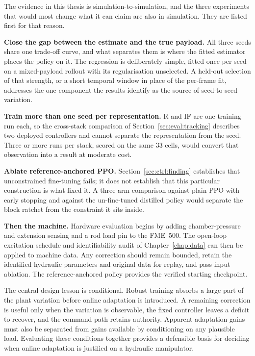 The evidence in this thesis is simulation-to-simulation, and the three
experiments that would most change what it can claim are also in simulation.
They are listed first for that reason.

\textbf{Close the gap between the estimate and the true payload.} All three
seeds share one trade-off curve, and what separates them is where the fitted
estimator places the policy on it. The regression is deliberately simple, fitted
once per seed on a mixed-payload rollout with its regularisation unselected. A
held-out selection of that strength, or a short temporal window in place of the
per-frame fit, addresses the one component the results identify as the source of
seed-to-seed variation.

\textbf{Train more than one seed per representation.} R and IF are one training
run each, so the cross-stack comparison of Section~\ref{sec:eval:tracking}
describes two deployed controllers and cannot separate the representation from
the seed. Three or more runs per stack, scored on the same $33$ cells, would
convert that observation into a result at moderate cost.

\textbf{Ablate reference-anchored PPO.} Section~\ref{sec:ctrl:finding}
establishes that unconstrained fine-tuning fails; it does not establish that
this particular construction is what fixed it. A three-arm comparison against
plain PPO with early stopping and against the un-fine-tuned distilled policy
would separate the block ratchet from the constraint it sits inside.

\textbf{Then the machine.} Hardware evaluation begins by adding chamber-pressure
and extension sensing and a rod load pin to the FME~500. The open-loop excitation
schedule and identifiability audit of Chapter~\ref{chap:data} can then be applied
to machine data. Any correction should remain bounded, retain the identified
hydraulic parameters and original data for replay, and pass input ablation. The
reference-anchored policy provides the verified starting checkpoint.

The central design lesson is conditional. Robust training absorbs a large part
of the plant variation before online adaptation is introduced. A remaining
correction is useful only when the variation is observable, the fixed controller
leaves a deficit to recover, and the command path retains authority. Apparent
adaptation gains must also be separated from gains available by conditioning on
any plausible load.
Evaluating these conditions together provides a defensible basis for deciding
when online adaptation is justified on a hydraulic manipulator.
